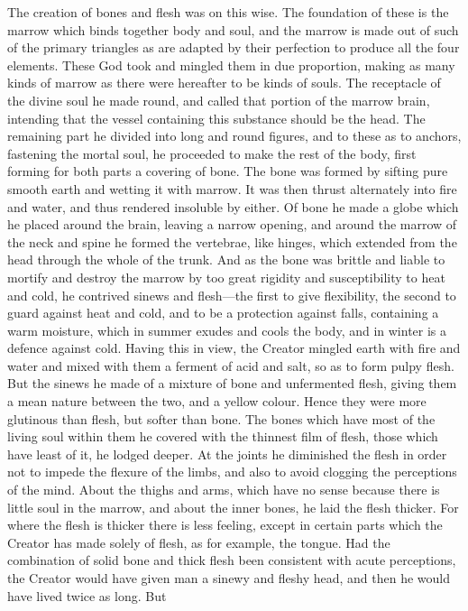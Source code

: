 The creation of bones and flesh was on this wise. The foundation of these
is the marrow which binds together body and soul, and the marrow is made
out of such of the primary triangles as are adapted by their perfection to
produce all the four elements. These God took and mingled them in due
proportion, making as many kinds of marrow as there were hereafter to be
kinds of souls. The receptacle of the divine soul he made round, and
called that portion of the marrow brain, intending that the vessel
containing this substance should be the head. The remaining part he
divided into long and round figures, and to these as to anchors, fastening
the mortal soul, he proceeded to make the rest of the body, first forming
for both parts a covering of bone. The bone was formed by sifting pure
smooth earth and wetting it with marrow. It was then thrust alternately
into fire and water, and thus rendered insoluble by either. Of bone he
made a globe which he placed around the brain, leaving a narrow opening,
and around the marrow of the neck and spine he formed the vertebrae, like
hinges, which extended from the head through the whole of the trunk. And
as the bone was brittle and liable to mortify and destroy the marrow by
too great rigidity and susceptibility to heat and cold, he contrived
sinews and flesh—the first to give flexibility, the second to guard
against heat and cold, and to be a protection against falls, containing a
warm moisture, which in summer exudes and cools the body, and in winter is
a defence against cold. Having this in view, the Creator mingled earth
with fire and water and mixed with them a ferment of acid and salt, so as
to form pulpy flesh. But the sinews he made of a mixture of bone and
unfermented flesh, giving them a mean nature between the two, and a yellow
colour. Hence they were more glutinous than flesh, but softer than bone.
The bones which have most of the living soul within them he covered with
the thinnest film of flesh, those which have least of it, he lodged
deeper. At the joints he diminished the flesh in order not to impede the
flexure of the limbs, and also to avoid clogging the perceptions of the
mind. About the thighs and arms, which have no sense because there is
little soul in the marrow, and about the inner bones, he laid the flesh
thicker. For where the flesh is thicker there is less feeling, except in
certain parts which the Creator has made solely of flesh, as for example,
the tongue. Had the combination of solid bone and thick flesh been
consistent with acute perceptions, the Creator would have given man a
sinewy and fleshy head, and then he would have lived twice as long. But
